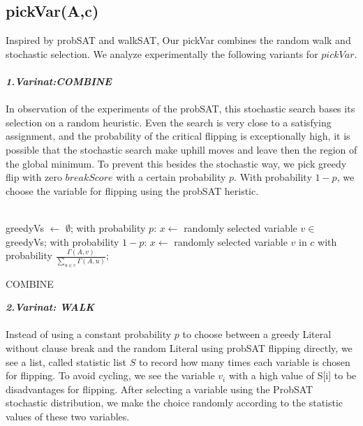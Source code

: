 \documentclass[12pt,a4paper,twoside]{scrartcl}
\numberwithin{equation}{section}
\begin{document}
\subsection{pickVar(A,c)}
Inspired by probSAT and walkSAT, Our pickVar combines the random walk and stochastic selection. We analyze experimentally the following variants for  $pickVar$.\\
\\ 
 \emph{\textbf{1.Varinat:COMBINE}}\\
\\
In observation of the experiments of the probSAT, this stochastic search bases its selection on a random heuristic.  Even the search is very close to a satisfying assignment, and the probability of the critical flipping is exceptionally high, it is possible that the stochastic search make uphill moves and leave then the region of the global minimum. To prevent this besides the stochastic way,  we pick greedy flip with zero $breakScore$ with a certain probability $p$. With probability $1-p$, we choose the variable for flipping using the probSAT heristic.\\
\\
\begin{algorithm}[H]
 greedyVs $\leftarrow$ $\emptyset$;\;
  with probability $p$: $x \leftarrow$ randomly selected variable $v \in$ greedyVs;  \;
  with probability $1-p$:   $x \leftarrow$ randomly selected  variable $v$ in $c$ with probability $\frac{\Gamma(A,v)}{\sum_{u \in c}\Gamma(A,u)}$;  
\caption{COMBINE}
\end{algorithm}  
 \emph{\textbf{2.Varinat: WALK}}\\
\\
Instead of using a constant probability $p$ to choose between a greedy Literal without clause break and the random Literal using probSAT flipping directly, we see a list, called statistic list $S$ to record how many times each variable is chosen for flipping.  To avoid cycling, we see the variable $v_i$ with a high value of S[i] to be disadvantages for flipping. After selecting a variable using the ProbSAT stochastic distribution, we make the choice randomly according to the statistic values of these two variables.\\
\end{document}
